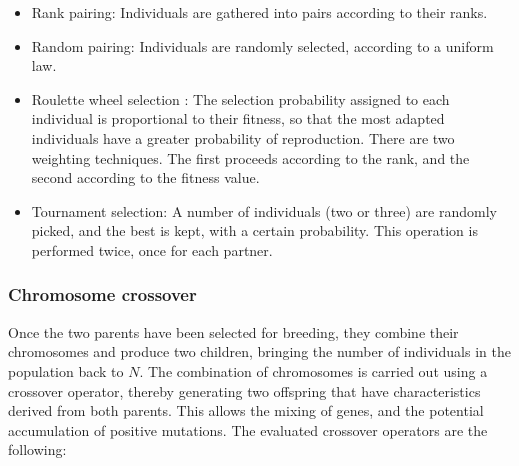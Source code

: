 \documentclass{ametsoc}
\begin{document}
\begin{itemize}
	\item Rank pairing: Individuals are gathered into pairs according to their ranks.
	
	\item Random pairing: Individuals are randomly selected, according to a uniform law.
	
	\item Roulette wheel selection \citep{Goldberg1989}: The selection probability assigned to each individual is proportional to their fitness, so that the most adapted individuals have a greater probability of reproduction. There are two weighting techniques. The first proceeds according to the rank, and the second according to the fitness value.
	
	\item Tournament selection: A number of individuals (two or three) are randomly picked, and the best is kept, with a certain probability. This operation is performed twice, once for each partner.
\end{itemize}


\subsubsection{Chromosome crossover}
\label{sec:gas:crossover}

Once the two parents have been selected for breeding, they combine their chromosomes and produce two children, bringing the number of individuals in the population back to $N$. The combination of chromosomes is carried out using a crossover operator, thereby generating two offspring that have characteristics derived from both parents. This allows the mixing of genes, and the potential accumulation of positive mutations. The evaluated crossover operators are the following:
\end{document}

